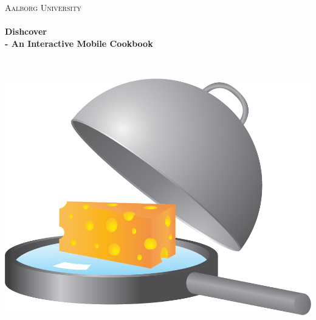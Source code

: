 \begin{titlingpage}\centering

\textsc{\LARGE Aalborg University}\\[0.3cm]

\HRule \\[0.4cm]
{\huge \bfseries Dishcover}\\[0.5cm]
{\Large \bfseries - An Interactive Mobile Cookbook}

\HRule \\[2cm]

\begin{minipage}{\columnwidth}
\centering
\includegraphics[width=0.85\linewidth]{img/logo4.png}
\end{minipage}


\end{titlingpage}
